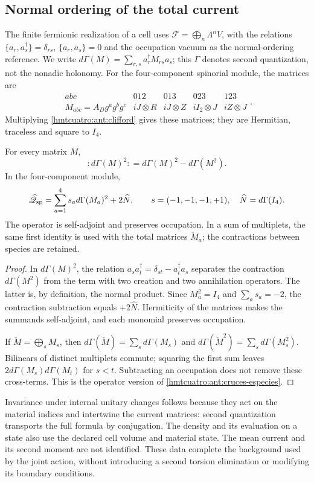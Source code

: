 \subsection{Normal ordering of the total current}
\label{hmtcuatro:ant:car}

The finite fermionic realization of a cell uses \(\mathcal F=\bigoplus_n\Lambda^n V\), with the relations \(\{a_r,a_s^\dagger\}=\delta_{rs}\), \(\{a_r,a_s\}=0\) and the occupation vacuum as the normal-ordering reference. We write \(d\Gamma(M)=\sum_{r,s}a_r^\dagger M_{rs}a_s\); this \(\Gamma\) denotes second quantization, not the nonadic holonomy. For the four-component spinorial module, the matrices are
\[
 \begin{array}{c|cccc}
 abc&012&013&023&123\\ \hline
 M_{abc}=A_Dg^ag^bg^c&
 iJ\otimes R&iJ\otimes Z&iI_2\otimes J&iZ\otimes J
 \end{array}.
\]
Multiplying \eqref{hmtcuatro:ant:clifford} gives these matrices; they are Hermitian, traceless and square to \(I_4\).

\begin{proposition}
\label{hmtcuatro:ant:orden-normal} For every matrix \(M\),
\[
 :d\Gamma(M)^2:
 =d\Gamma(M)^2-d\Gamma(M^2).
\]
In the four-component module,
\[
 \widehat{\mathscr Q}_{\rm sp}
 =\sum_{a=1}^4s_a d\Gamma(M_a)^2+2\widehat N,
 \qquad s=(-1,-1,-1,+1),\quad \widehat N=d\Gamma(I_4).
\]
The operator is self-adjoint and preserves occupation. In a sum of multiplets, the same first identity is used with the total matrices \(\widetilde M_a\); the contractions between species are retained.
\end{proposition}
\begin{proof}
In \(d\Gamma(M)^2\), the relation \(a_sa_t^\dagger=\delta_{st}-a_t^\dagger a_s\) separates the contraction \(d\Gamma(M^2)\) from the term with two creation and two annihilation operators. The latter is, by definition, the normal product. Since \(M_a^2=I_4\) and \(\sum_a s_a=-2\), the contraction subtraction equals \(+2\widehat N\). Hermiticity of the matrices makes the summands self-adjoint, and each monomial preserves occupation.

If \(\widetilde M=\bigoplus_s M_s\), then \(d\Gamma(\widetilde M)=\sum_s d\Gamma(M_s)\) and \(d\Gamma(\widetilde M^2)=\sum_s d\Gamma(M_s^2)\). Bilinears of distinct multiplets commute; squaring the first sum leaves \(2d\Gamma(M_s)d\Gamma(M_t)\) for \(s<t\). Subtracting an occupation does not remove these cross-terms. This is the operator version of \eqref{hmtcuatro:ant:cruces-especies}.
\end{proof}

Invariance under internal unitary changes follows because they act on the material indices and intertwine the current matrices: second quantization transports the full formula by conjugation. The density and its evaluation on a state also use the declared cell volume and material state. The mean current and its second moment are not identified. These data complete the background used by the joint action, without introducing a second torsion elimination or modifying its boundary conditions.
